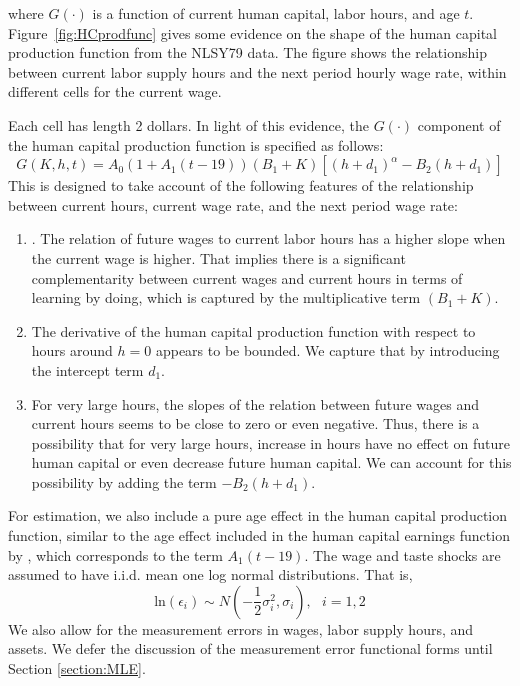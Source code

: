 \documentclass{article}
\begin{document}
  where $G(\cdot)$ is a function of current human capital, labor hours, and age $t$. Figure~\ref{fig:HCprodfunc} gives some evidence on the shape of the human capital production function from the NLSY79 data. The figure shows the relationship between current labor supply hours and the next period hourly wage rate, within different cells for the current wage.
%

  Each cell has length 2 dollars. In light of this evidence, the $G(\cdot)$ component of the human capital production function is specified as follows:
  \begin{equation} \tag{4b}
    G(K,h,t) = A_0(1 + A_1(t-19))(B_1+K)[(h+d_1)^{\alpha} - B_2(h+d_1)]
  \end{equation}
  This is designed to take account of the following features of the relationship between current hours, current wage rate, and the next period wage rate:
  \begin{enumerate}
  \item . The relation of future wages to current labor hours has a higher slope when the current wage is higher. That implies there is a significant complementarity between current wages and current hours in terms of learning by doing, which is captured by the multiplicative term $(B_1 + K)$.
  \item The derivative of the human capital production function with respect to hours around $h = 0$ appears to be bounded. We capture that by introducing the intercept term $d_1$.
  \item For very large hours, the slopes of the relation between future wages and current hours seems to be close to zero or even negative. Thus, there is a possibility that for very large hours, increase in hours have no effect on future human capital or even decrease future human capital. We can account for this possibility by adding the term $-B_2(h+d_1)$.
  \end{enumerate}
For estimation, we also include a pure age effect in the human capital production function, similar to the age effect included in the human capital earnings function by \cite{Keane1997-mg}, which corresponds to the term $A_1(t - 19)$. The wage and taste shocks are assumed to have i.i.d. mean one log normal distributions. That is,
  \begin{equation} \tag{7}
    \text{ln} (\epsilon_i) \sim N(-\frac{1}{2} \sigma_i^2, \sigma_i),~~~i=1,2
  \end{equation}
We also allow for the measurement errors in wages, labor supply hours, and assets. We defer the discussion of the measurement error functional forms until Section \ref{section:MLE}. \par
\end{document}
